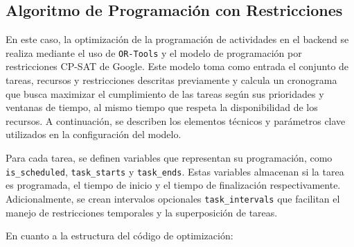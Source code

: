 \documentclass{article}
\begin{document}
\subsection{Algoritmo de Programación con Restricciones}


En este caso, la optimización de la programación de actividades en el backend se realiza mediante el uso de \texttt{OR-Tools} y el modelo de programación por restricciones CP-SAT de Google. Este modelo toma como entrada el conjunto de tareas, recursos y restricciones descritas previamente y calcula un cronograma que busca maximizar el cumplimiento de las tareas según sus prioridades y ventanas de tiempo, al mismo tiempo que respeta la disponibilidad de los recursos. A continuación, se describen los elementos técnicos y parámetros clave utilizados en la configuración del modelo.

Para cada tarea, se definen variables que representan su programación, como \texttt{is\_scheduled}, \texttt{task\_starts} y \texttt{task\_ends}. Estas variables almacenan si la tarea es programada, el tiempo de inicio y el tiempo de finalización respectivamente. Adicionalmente, se crean intervalos opcionales \texttt{task\_intervals} que facilitan el manejo de restricciones temporales y la superposición de tareas.

En cuanto a la estructura del código de optimización:
\end{document}
